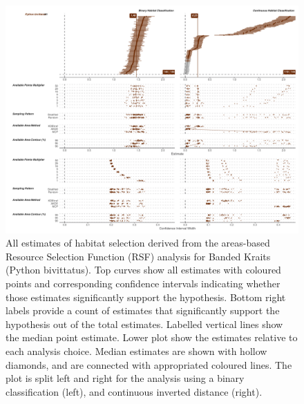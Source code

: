 \documentclass[10pt,a4paper]{article}
\begin{document}
\begin{figure}
\includegraphics[width=1\linewidth]{../../figures/specCurve_Python bivittatus_rsf} \caption{All estimates of habitat selection derived from the areas-based Resource Selection Function (RSF) analysis for Banded Kraits (Python bivittatus). Top curves show all estimates with coloured points and corresponding confidence intervals indicating whether those estimates significantly support the hypothesis. Bottom right labels provide a count of estimates that significantly support the hypothesis out of the total estimates. Labelled vertical lines show the median point estimate. Lower plot show the estimates relative to each analysis choice. Median estimates are shown with hollow diamonds, and are connected with appropriated coloured lines. The plot is split left and right for the analysis using a binary classification (left), and continuous inverted distance (right).}\label{fig:specCurveRsfPYBI}
\end{figure}
\end{document}
